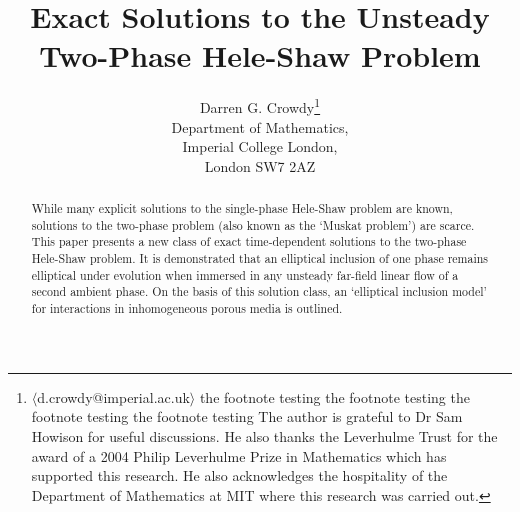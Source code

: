 \documentclass[fleqn]{jleo}
\begin{document}
\title{Exact Solutions to the Unsteady Two-Phase Hele-Shaw Problem}

\author{Darren G. Crowdy\setcounter{footnote}{1}\thanks{$\langle${d.crowdy@imperial.ac.uk}$\rangle$
 the footnote testing the footnote testing  the footnote testing the footnote testing\newline
\hspace*{10.5pt}The author is grateful to Dr Sam Howison for useful discussions. He also
thanks the Leverhulme Trust for the award of a 2004 Philip Leverhulme Prize
in Mathematics which has supported this research. He also acknowledges the
hospitality of the Department of Mathematics at MIT where this research was carried out.
}\\
Department of Mathematics,\\ Imperial College London,\\ London  SW7 2AZ}

\maketitle


\pagestyle{headings}
\begin{abstract} 
{While many explicit solutions to the single-phase Hele-Shaw problem 
are known, solutions to the two-phase problem (also known as the `Muskat
problem') are scarce. This paper presents a new class of exact time-dependent
solutions to the two-phase  Hele-Shaw problem. It is demonstrated that an
elliptical inclusion of one phase remains elliptical under evolution when
immersed in any unsteady far-field linear flow of a second ambient phase.
On the basis of this solution class, an `elliptical inclusion model'  for
interactions in inhomogeneous porous media is outlined.}
{ }
\end{abstract}
\end{document}
